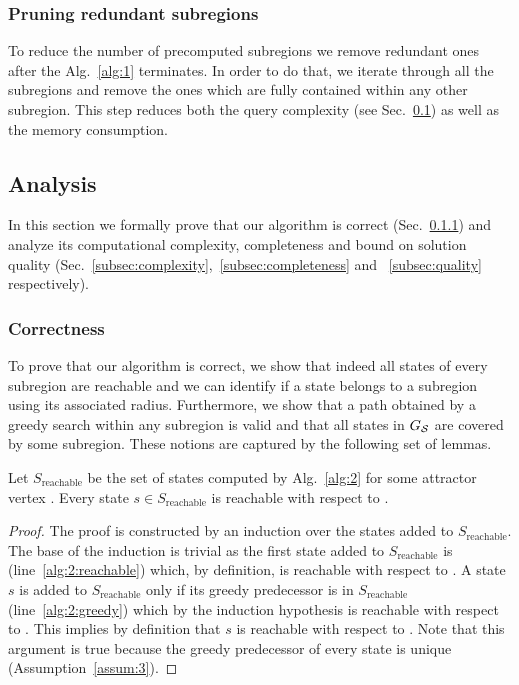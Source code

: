 \documentclass[a4paper,10pt]{article}
\begin{document}
\subsubsection{Pruning redundant subregions}
To reduce the number of precomputed subregions we remove redundant ones after the Alg.~\ref{alg:1} terminates. 
In order to do that, we iterate through all the subregions and remove the ones which are fully contained within any other subregion. 
This step reduces both the query complexity (see Sec.~\ref{sec:analysis}) as well as the memory consumption.

\subsection{Analysis}
\label{sec:analysis}
In this section we formally prove that 
our algorithm is correct (Sec.~\ref{subsec:correct}) and 
analyze its computational complexity, completeness and bound on solution quality (Sec.~\ref{subsec:complexity},~\ref{subsec:completeness} and ~\ref{subsec:quality} respectively).

\subsubsection{Correctness}
\label{subsec:correct}
To prove that our algorithm is correct, we show that indeed all states of every subregion are reachable and we can identify if a state belongs to a subregion using its associated radius.
Furthermore, we show that a path obtained by a greedy search within any subregion is valid and that all states in $G_\mathcal{S}$ are covered by some subregion.
These notions are captured by the following set of lemmas.

\vspace{2mm}
\begin{lemma}
\label{lemma:reachable-1}
Let $S_{\text{reachable}}$ be the set of states computed by Alg.~\ref{alg:2} for some attractor vertex \sAttract.
%
Every state $s \in S_{\text{reachable}}$ is reachable with respect to \sAttract.
\end{lemma}
%
\begin{proof}
The proof is constructed by an induction over the states added to $S_{\text{reachable}}$.
The base of the induction is trivial as the first state added to $S_{\text{reachable}}$  is \sAttract (line~\ref{alg:2:reachable}) which, by definition, is reachable with respect to \sAttract.
%
A state $s$ is added to $S_{\text{reachable}}$ only if its greedy predecessor is in $S_{\text{reachable}}$ (line~\ref{alg:2:greedy}) which by the induction hypothesis is reachable with respect to \sAttract.
This implies by definition that $s$ is reachable with respect to \sAttract.
%
Note that this argument is true because the greedy predecessor of every state is unique (Assumption~\ref{assum:3}).
\end{proof}
\end{document}
